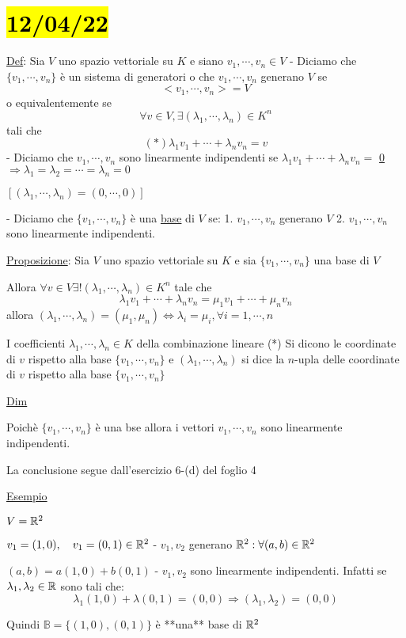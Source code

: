\documentclass{article}
\begin{document}
\section{\hl{12/04/22}}

\ul{Def}: Sia $V$ uno spazio vettoriale su $K$ e siano $v_1,\cdots,v_n\in V$
- Diciamo che $\{v_1,\cdots,v_n\}$ è un sistema di generatori o che $v_1,\cdots,v_n$ generano $V$ se
  $$<v_1,\cdots,v_n>=V$$
  o equivalentemente se
  $$\forall v\in V,\exists(\lambda_1,\cdots,\lambda_n)\in K^n$$
  tali che
  $$(*)\lambda_1v_1+\cdots+\lambda_nv_n=v$$
- Diciamo che $v_1,\cdots,v_n$ sono linearmente indipendenti se $\lambda_1v_1+\cdots+\lambda_nv_n=$ \ul{0} $\Rightarrow\lambda_1=\lambda_2=\cdots=\lambda_n=0$

  $[(\lambda_1,\cdots,\lambda_n)=(0,\cdots,0)]$

- Diciamo che $\{v_1,\cdots,v_n\}$ è una \ul{base} di $V$ se:
  1. $v_1,\cdots,v_n$ generano $V$
  2. $v_1,\cdots,v_n$ sono linearmente indipendenti.

\ul{Proposizione}: Sia $V$ uno spazio vettoriale su $K$ e sia $\{v_1,\cdots,v_n\}$ una base di $V$

Allora $\forall v\in V\exists!(\lambda_1,\cdots,\lambda_n)\in K^n$ tale che
$$\lambda_1v_1+\cdots+\lambda_nv_n=\mu_1v_1+\cdots+\mu_nv_n$$
allora $(\lambda_1,\cdots,\lambda_n)=(\mu_1,\mu_n)\Leftrightarrow\lambda_i=\mu_i,\forall i=1,\cdots,n$

I coefficienti $\lambda_1,\cdots,\lambda_n\in K$ della combinazione lineare (*) Si dicono le coordinate di $v$ rispetto alla base $\{v_1,\cdots,v_n\}$ e $(\lambda_1,\cdots,\lambda_n)$ si dice la $n$-upla delle coordinate di $v$ rispetto alla base $\{v_1,\cdots,v_n\}$

\ul{Dim}

Poichè $\{v_1,\cdots,v_n\}$ è una bse allora i vettori $v_1,\cdots,v_n$ sono linearmente indipendenti.

La conclusione segue dall'esercizio 6-(d) del foglio 4

\ul{Esempio}

$V=\mathbb{R}^2$

$v_1=(1,0),\quad v_1=(0,1)\in\mathbb{R}^2$
- $v_1,v_2$ generano $\mathbb{R}^2:\forall(a,b)\in\mathbb{R}^2$

  $(a,b)=a(1,0)+b(0,1)$
- $v_1,v_2$ sono linearmente indipendenti. Infatti se $\lambda_1,\lambda_2\in\mathbb{R}$ sono tali che:
  $$\lambda_1(1,0)+\lambda(0,1)=(0,0)\Rightarrow(\lambda_1,\lambda_2)=(0,0)$$

  Quindi $\mathbb{B}=\{(1,0),(0,1)\}$ è **una** base di $\mathbb{R}^2$
\end{document}
